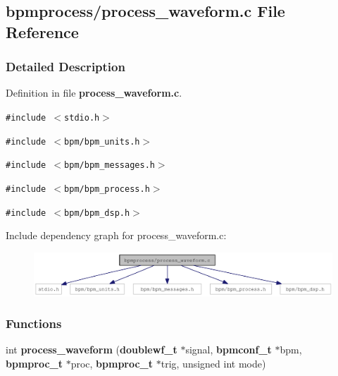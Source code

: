 \subsection{bpmprocess/process\_\-waveform.c File Reference}
\label{process__waveform_8c}


\subsubsection{Detailed Description}


Definition in file {\bf process\_\-waveform.c}.

{\tt \#include $<$stdio.h$>$}\par
{\tt \#include $<$bpm/bpm\_\-units.h$>$}\par
{\tt \#include $<$bpm/bpm\_\-messages.h$>$}\par
{\tt \#include $<$bpm/bpm\_\-process.h$>$}\par
{\tt \#include $<$bpm/bpm\_\-dsp.h$>$}\par


Include dependency graph for process\_\-waveform.c:\nopagebreak
\begin{figure}[H]
\begin{center}
\leavevmode
\includegraphics[width=321pt]{process__waveform_8c__incl}
\end{center}
\end{figure}
\subsubsection*{Functions}
\begin{CompactItemize}
\item 
int {\bf process\_\-waveform} ({\bf doublewf\_\-t} $\ast$signal, {\bf bpmconf\_\-t} $\ast$bpm, {\bf bpmproc\_\-t} $\ast$proc, {\bf bpmproc\_\-t} $\ast$trig, unsigned int mode)
\end{CompactItemize}
